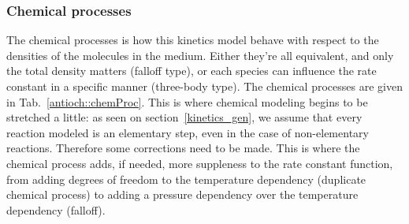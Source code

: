 \subsubsection{Chemical processes}
\label{subsec:chem_proc}
The chemical processes is how this kinetics model behave with respect to
the densities of the molecules in the medium. Either they're all equivalent,
and only the total density matters (falloff type), or each species can 
influence the rate constant in a specific manner (three-body type).
The chemical processes are given in Tab.~\ref{antioch::chemProc}. This is where
chemical modeling begins to be stretched a little: as seen on section~\ref{kinetics_gen},
we assume that every reaction modeled is an elementary step, even in the case of
non-elementary reactions. Therefore some corrections need to be made. This is where
the chemical process adds, if needed, more suppleness to the rate constant
function, from adding degrees of freedom to the temperature dependency (duplicate
chemical process) to adding a pressure dependency over the temperature dependency
(falloff).
